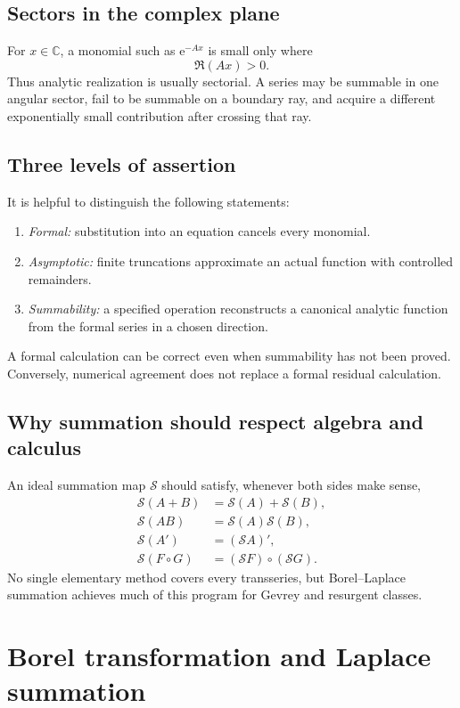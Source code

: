 \documentclass[11pt,openany]{book}
\theoremstyle{plain}
\theoremstyle{definition}
\theoremstyle{remark}
\newcommand{\C}{\mathbb{C}}
\newcommand{\e}{\mathrm{e}}
\begin{document}
\section{Sectors in the complex plane}
For $x\in\C$, a monomial such as $\e^{-Ax}$ is small only where
\[
  \Re(Ax)>0.
\]
Thus analytic realization is usually sectorial. A series may be summable in one angular sector, fail to be summable on a boundary ray, and acquire a different exponentially small contribution after crossing that ray.

\section{Three levels of assertion}
It is helpful to distinguish the following statements:
\begin{enumerate}
\item \emph{Formal:} substitution into an equation cancels every monomial.
\item \emph{Asymptotic:} finite truncations approximate an actual function with controlled remainders.
\item \emph{Summability:} a specified operation reconstructs a canonical analytic function from the formal series in a chosen direction.
\end{enumerate}
A formal calculation can be correct even when summability has not been proved. Conversely, numerical agreement does not replace a formal residual calculation.

\section{Why summation should respect algebra and calculus}
An ideal summation map $\mathscr S$ should satisfy, whenever both sides make sense,
\begin{align*}
  \mathscr S(A+B)&=\mathscr S(A)+\mathscr S(B),\\
  \mathscr S(AB)&=\mathscr S(A)\mathscr S(B),\\
  \mathscr S(A')&=(\mathscr S A)',\\
  \mathscr S(F\circ G)&=(\mathscr S F)\circ(\mathscr S G).
\end{align*}
No single elementary method covers every transseries, but Borel--Laplace summation achieves much of this program for Gevrey and resurgent classes.

\chapter{Borel transformation and Laplace summation}
\label{chap:borel}
\end{document}
